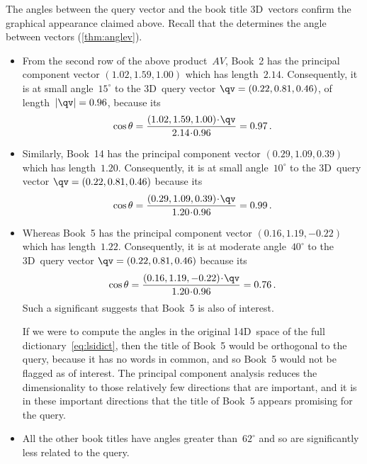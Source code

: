 The angles between the query vector and the book title 3D~vectors confirm the graphical appearance claimed above.
Recall that the  determines the angle between vectors (\autoref{thm:anglev}).
\begin{itemize}
\item From the second row of the above product~\(AV\), Book~2 has the principal component vector \((1.02,1.59,1.00)\) which has length~\(2.14\).
Consequently, it is at small angle~\(15^\circ\) to the 3D~query vector \(\qv=(0.22,0.81,0.46)\), of length~\(|\qv|=0.96\), because its 
\begin{equation*}
\cos\theta=\frac{(1.02,1.59,1.00)\cdot\qv}{2.14\cdot0.96}
=0.97\,.
\end{equation*}

\item Similarly, Book~14 has the principal component vector \((0.29,1.09,0.39)\) which has length~\(1.20\).
Consequently, it is at small angle~\(10^\circ\) to the 3D~query vector \(\qv=(0.22,0.81,0.46)\) because its 
\begin{equation*}
\cos\theta=\frac{(0.29,1.09,0.39)\cdot\qv}{1.20\cdot0.96}
=0.99\,.
\end{equation*}

\item Whereas Book~5 has the principal component vector \((0.16,1.19,-0.22)\) which has length~\(1.22\).
Consequently, it is at moderate angle~\(40^\circ\) to the 3D~query vector \(\qv=(0.22,0.81,0.46)\) because its 
\begin{equation*}
\cos\theta=\frac{(0.16,1.19,-0.22)\cdot\qv}{1.20\cdot0.96}
=0.76\,.
\end{equation*}
Such a significant  suggests that Book~5 is also of interest.

If we were to compute the angles in the original 14D~space of the full dictionary~\eqref{eq:lsidict}, then the title of Book~5 would be orthogonal to the query, because it has no words in common, and so Book~5 would not be flagged as of interest.
The principal component analysis reduces the dimensionality to those relatively few directions that are important, and it is in these important directions that the title of Book~5 appears promising for the query.

\item All the other book titles have angles greater than~\(62^\circ\) and so are significantly less related to the query.
\end{itemize}



